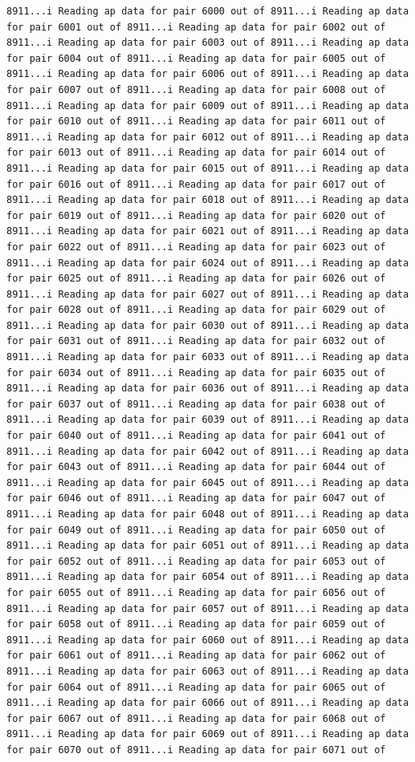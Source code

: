 \documentclass[
]{article}
\begin{document}
\begin{verbatim}
8911...i Reading ap data for pair 6000 out of 8911...i Reading ap data for pair 6001 out of 8911...i Reading ap data for pair 6002 out of 8911...i Reading ap data for pair 6003 out of 8911...i Reading ap data for pair 6004 out of 8911...i Reading ap data for pair 6005 out of 8911...i Reading ap data for pair 6006 out of 8911...i Reading ap data for pair 6007 out of 8911...i Reading ap data for pair 6008 out of 8911...i Reading ap data for pair 6009 out of 8911...i Reading ap data for pair 6010 out of 8911...i Reading ap data for pair 6011 out of 8911...i Reading ap data for pair 6012 out of 8911...i Reading ap data for pair 6013 out of 8911...i Reading ap data for pair 6014 out of 8911...i Reading ap data for pair 6015 out of 8911...i Reading ap data for pair 6016 out of 8911...i Reading ap data for pair 6017 out of 8911...i Reading ap data for pair 6018 out of 8911...i Reading ap data for pair 6019 out of 8911...i Reading ap data for pair 6020 out of 8911...i Reading ap data for pair 6021 out of 8911...i Reading ap data for pair 6022 out of 8911...i Reading ap data for pair 6023 out of 8911...i Reading ap data for pair 6024 out of 8911...i Reading ap data for pair 6025 out of 8911...i Reading ap data for pair 6026 out of 8911...i Reading ap data for pair 6027 out of 8911...i Reading ap data for pair 6028 out of 8911...i Reading ap data for pair 6029 out of 8911...i Reading ap data for pair 6030 out of 8911...i Reading ap data for pair 6031 out of 8911...i Reading ap data for pair 6032 out of 8911...i Reading ap data for pair 6033 out of 8911...i Reading ap data for pair 6034 out of 8911...i Reading ap data for pair 6035 out of 8911...i Reading ap data for pair 6036 out of 8911...i Reading ap data for pair 6037 out of 8911...i Reading ap data for pair 6038 out of 8911...i Reading ap data for pair 6039 out of 8911...i Reading ap data for pair 6040 out of 8911...i Reading ap data for pair 6041 out of 8911...i Reading ap data for pair 6042 out of 8911...i Reading ap data for pair 6043 out of 8911...i Reading ap data for pair 6044 out of 8911...i Reading ap data for pair 6045 out of 8911...i Reading ap data for pair 6046 out of 8911...i Reading ap data for pair 6047 out of 8911...i Reading ap data for pair 6048 out of 8911...i Reading ap data for pair 6049 out of 8911...i Reading ap data for pair 6050 out of 8911...i Reading ap data for pair 6051 out of 8911...i Reading ap data for pair 6052 out of 8911...i Reading ap data for pair 6053 out of 8911...i Reading ap data for pair 6054 out of 8911...i Reading ap data for pair 6055 out of 8911...i Reading ap data for pair 6056 out of 8911...i Reading ap data for pair 6057 out of 8911...i Reading ap data for pair 6058 out of 8911...i Reading ap data for pair 6059 out of 8911...i Reading ap data for pair 6060 out of 8911...i Reading ap data for pair 6061 out of 8911...i Reading ap data for pair 6062 out of 8911...i Reading ap data for pair 6063 out of 8911...i Reading ap data for pair 6064 out of 8911...i Reading ap data for pair 6065 out of 8911...i Reading ap data for pair 6066 out of 8911...i Reading ap data for pair 6067 out of 8911...i Reading ap data for pair 6068 out of 8911...i Reading ap data for pair 6069 out of 8911...i Reading ap data for pair 6070 out of 8911...i Reading ap data for pair 6071 out of 
\end{verbatim}
\end{document}
